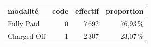 \begin{tabular}{lrrr}
\toprule
\textbf{modalité} & \textbf{code} & \textbf{effectif} & \textbf{proportion} \\
\midrule
Fully Paid & 0 & 7\,692 & 76,93\,\% \\
Charged Off & 1 & 2\,307 & 23,07\,\% \\
\bottomrule
\end{tabular}
